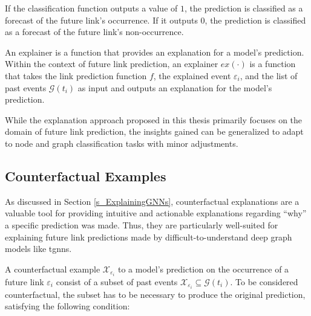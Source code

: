 If the classification function outputs a value of $1$, the prediction is classified as a forecast of the future link's occurrence. If it outputs $0$, the prediction is classified as a forecast of the future link's non-occurrence.

An explainer is a function that provides an explanation for a model's prediction. Within the context of future link prediction, an explainer $ex(\cdot)$ is a function that takes the link prediction function $f$, the explained event $\varepsilon_{i}$, and the list of past events $\mathcal{G}(t_i)$ as input and outputs an explanation for the model's prediction.

While the explanation approach proposed in this thesis primarily focuses on the domain of future link prediction, the insights gained can be generalized to adapt to node and graph classification tasks with minor adjustments.

\subsection{Counterfactual Examples}
\label{s_ProblemFormulation_CFExamples}

As discussed in Section \ref{s_ExplainingGNNs}, counterfactual explanations are a valuable tool for providing intuitive and actionable explanations regarding “why” a specific prediction was made. Thus, they are particularly well-suited for explaining future link predictions made by difficult-to-understand deep graph models like \glspl{tgnn}.


A counterfactual example $\mathcal{X}_{\varepsilon_i}$ to a model's prediction on the occurrence of a future link $\varepsilon_{i}$ consist of a subset of past events $\mathcal{X}_{\varepsilon_i} \subseteq \mathcal{G}(t_i)$. To be considered counterfactual, the subset has to be necessary to produce the original prediction, satisfying the following condition:


